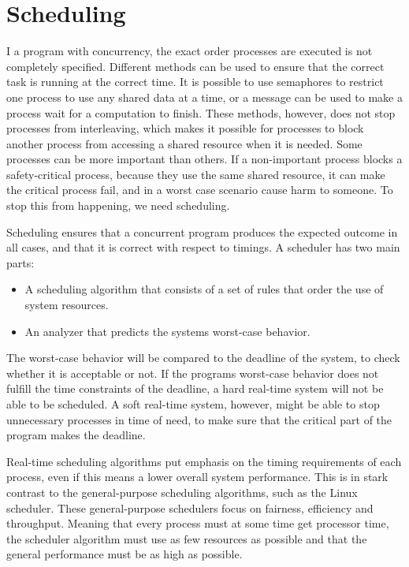 \section{Scheduling}
I a program with concurrency, the exact order processes are executed is not completely specified. Different methods can be used to ensure that the correct task is running at the correct time. It is possible to use semaphores to restrict one process to use any shared data at a time, or a message can be used to make a process wait for a computation to finish. These methods, however, does not stop processes from interleaving, which makes it possible for processes to block another process from accessing a shared resource when it is needed. Some processes can be more important than others. If a non-important process blocks a safety-critical process, because they use the same shared resource, it can make the critical process fail, and in a worst case scenario cause harm to someone. To stop this from happening, we need scheduling.

Scheduling ensures that a concurrent program produces the expected outcome in all cases, and that it is correct with respect to timings. A scheduler has two main parts: 

\begin{itemize}
\item A scheduling algorithm that consists of a set of rules that order the use of system resources.
\item An analyzer that predicts the systems worst-case behavior.
\end{itemize}

The worst-case behavior will be compared to the deadline of the system, to check whether it is acceptable or not. If the programs worst-case behavior does not fulfill the time constraints of the deadline, a hard real-time system will not be able to be scheduled. A soft real-time system, however, might be able to stop unnecessary processes in time of need, to make sure that the critical part of the program makes the deadline.

Real-time scheduling algorithms put emphasis on the timing requirements of each process, even if this means a lower overall system performance. This is in stark contrast to the general-purpose scheduling algorithms, such as the Linux scheduler. These general-purpose schedulers focus on fairness, efficiency and throughput. Meaning that every process must at some time get processor time, the scheduler algorithm must use as few resources as possible and that the general performance must be as high as possible.

